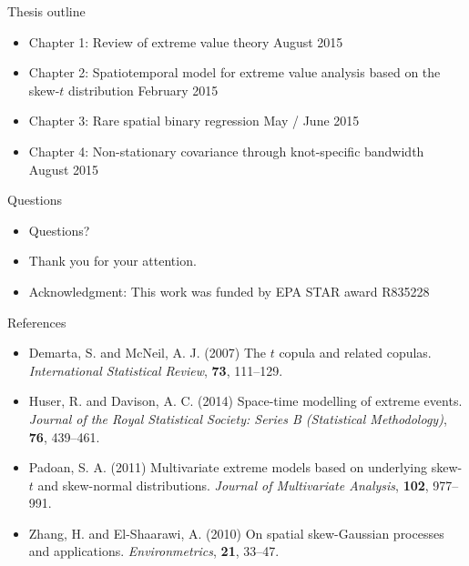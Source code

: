 \documentclass{beamer}
\begin{document}
\begin{frame}{Thesis outline}
  \begin{itemize} \setlength{\itemsep}{1em}
    \item Chapter 1: Review of extreme value theory \alert{August 2015}
    \item Chapter 2: Spatiotemporal model for extreme value analysis based on the skew-$t$ distribution \alert{February 2015}
    \item Chapter 3: Rare spatial binary regression \alert{May / June 2015}
    \item Chapter 4: Non-stationary covariance through knot-specific bandwidth \alert{August 2015}
  \end{itemize}
\end{frame}

\begin{frame}{Questions}
  \begin{itemize} \setlength{\itemsep}{1em}
    \item Questions?
    \item Thank you for your attention.
    \item Acknowledgment: This work was funded by EPA STAR award R835228
  \end{itemize}
\end{frame}

\begin{frame}[allowframebreaks]{References}
  \begin{itemize} \setlength{\itemsep}{1em}
    \item Demarta, S. and McNeil, A. J. (2007) The $t$ copula and related copulas. {\it International Statistical Review}, {\bf 73}, 111--129.
    \item Huser, R. and Davison, A. C. (2014) Space-time modelling of extreme events. {\it Journal of the Royal Statistical Society: Series B (Statistical Methodology)}, {\bf 76}, 439--461.
    \item Padoan, S. A. (2011) Multivariate extreme models based on underlying skew-$t$ and skew-normal distributions. {\it Journal of Multivariate Analysis}, {\bf 102}, 977--991.
    \item Zhang, H. and El-Shaarawi, A. (2010) On spatial skew-Gaussian processes and applications. {\it Environmetrics}, {\bf 21}, 33--47.
  \end{itemize}
\end{frame}
\end{document}
